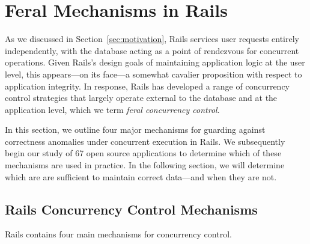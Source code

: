 
\section{Feral Mechanisms in Rails}
\label{sec:rails-cc}

As we discussed in Section~\ref{sec:motivation}, Rails services user
requests entirely independently, with the database acting as a point
of rendezvous for concurrent operations. Given Rails's design goals of
maintaining application logic at the user level, this appears---on its
face---a somewhat cavalier proposition with respect to application
integrity. In response, Rails has developed a range of
concurrency control strategies that largely operate external to the
database and at the application level, which we term \textit{feral
  concurrency control}.

In this section, we outline four major mechanisms for guarding against
correctness anomalies under concurrent execution in Rails. We
subsequently begin our study of 67 open source applications to
determine which of these mechanisms are used in practice. In the following
section, we will determine which are are sufficient to maintain
correct data---and when they are not.

\subsection{Rails Concurrency Control Mechanisms}

Rails contains four main mechanisms for concurrency control.

